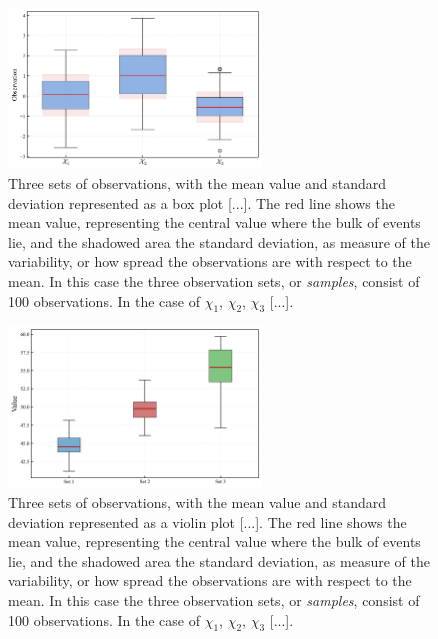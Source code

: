 \documentclass{book}
\begin{document}
\begin{figure}[ht]
    \centering
    \includegraphics[width=0.6\textwidth]{figures/chapter1/mean_std_box.png}
    \caption{Three sets of observations, with the mean value and standard deviation represented as a box plot [...]. The red line shows the mean value, representing the central value where the bulk of events lie, and the shadowed area the standard deviation, as measure of the variability, or how spread the observations are with respect to the mean. In this case the three observation sets, or \textit{samples}, consist of 100 observations. In the case of $\chi_1$, $\chi_2$, $\chi_3$ [...].}
    \label{fig:histogram1}
\end{figure}

\begin{figure}[ht]
    \centering
    \includegraphics[width=0.6\textwidth]{figures/chapter1/measurements_boxplot.png}
    \caption{Three sets of observations, with the mean value and standard deviation represented as a violin plot [...]. The red line shows the mean value, representing the central value where the bulk of events lie, and the shadowed area the standard deviation, as measure of the variability, or how spread the observations are with respect to the mean. In this case the three observation sets, or \textit{samples}, consist of 100 observations. In the case of $\chi_1$, $\chi_2$, $\chi_3$ [...].}
    \label{fig:histogram1}
\end{figure}
\end{document}
